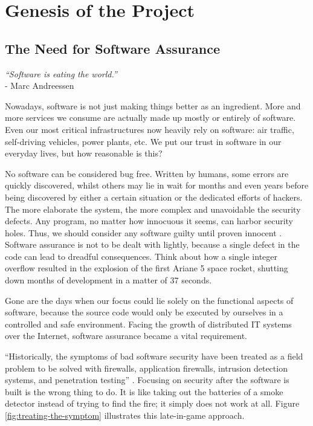 \section{Genesis of the Project}

\subsection{The Need for Software Assurance}

\begin{center}
    \emph{``Software is eating the world.''\\}
    - Marc Andreessen
\end{center}

Nowadays, software is not just making things better as an ingredient. More and more services we consume are actually made up mostly or entirely of software. Even our most critical infrastructures now heavily rely on software: air traffic, self-driving vehicles, power plants, etc. We put our trust in software in our everyday lives, but how reasonable is this?

No software can be considered bug free. Written by humans, some errors are quickly discovered, whilst others may lie in wait for months and even years before being discovered by either a certain situation or the dedicated efforts of hackers. The more elaborate the system, the more complex and unavoidable the security defects. Any program, no matter how innocuous it seems, can harbor security holes. Thus, we should consider any software guilty until proven innocent \cite{cheswick2003firewalls}. Software assurance is not to be dealt with lightly, because a single defect in the code can lead to dreadful consequences. Think about how a single integer overflow resulted in the explosion of the first Ariane 5 space rocket, shutting down months of development in a matter of 37 seconds.

Gone are the days when our focus could lie solely on the functional aspects of software, because the source code would only be executed by ourselves in a controlled and safe environment. Facing the growth of distributed IT systems over the Internet, software assurance became a vital requirement.

``Historically, the symptoms of bad software security have been treated as a field problem to be solved with firewalls, application firewalls, intrusion detection systems, and penetration testing'' \cite{chess2007secure}. Focusing on security after the software is built is the wrong thing to do. It is like taking out the batteries of a smoke detector instead of trying to find the fire; it simply does not work at all. Figure \ref{fig:treating-the-symptom} illustrates this late-in-game approach.

